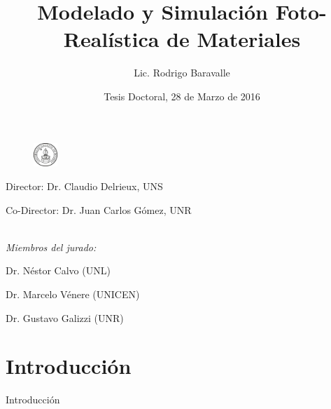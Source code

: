 \documentclass[spanish,unknownkeysallowed,10pt]{beamer}
\begin{document}
\title
    [Modelado Foto-Realístico de Materiales]{Modelado y Simulación Foto-Realística de Materiales}

\author[Lic. Rodrigo Baravalle]{Lic. Rodrigo Baravalle}
 

\date{Tesis Doctoral, 28 de Marzo de 2016}

\begin{frame}
\begin{figure}
{\includegraphics[width=0.08\textwidth]{../figures/logounr}}
\end{figure}
\vspace{-1cm}
  \titlepage
\centering
\vspace{-.4cm}
\begin{tiny}
Director: Dr. Claudio Delrieux, UNS

Co-Director: Dr. Juan Carlos Gómez, UNR

\ \\

\it{Miembros del jurado:}

Dr. Néstor Calvo (UNL)

Dr. Marcelo Vénere (UNICEN)

Dr. Gustavo Galizzi (UNR)

\end{tiny}

\end{frame}

\section{Introducción}

\begin{frame}
\begin{block}{}
\begin{center}
\vspace{1cm}
\huge{Introducción}
\vspace{1cm}
\end{center}
\end{block}
\end{frame}
\end{document}

